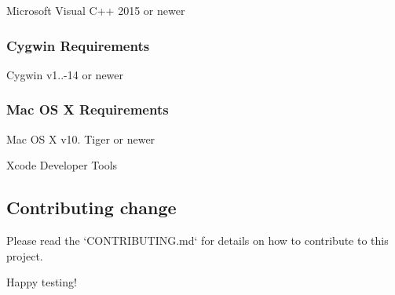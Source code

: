 \begin{DoxyItemize}
\item Microsoft Visual C++ 2015 or newer
\end{DoxyItemize}

\subsubsection*{Cygwin Requirements}


\begin{DoxyItemize}
\item Cygwin v1..-\/14 or newer
\end{DoxyItemize}

\subsubsection*{Mac OS X Requirements}


\begin{DoxyItemize}
\item Mac OS X v10. Tiger or newer
\item Xcode Developer Tools
\end{DoxyItemize}

\subsection*{Contributing change}

Please read the `\+C\+O\+N\+T\+R\+I\+B\+U\+T\+I\+NG.md` for details on how to contribute to this project.

Happy testing! 